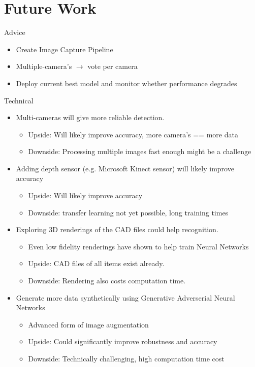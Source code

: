 \documentclass{beamer}
\begin{document}
\section{Future Work}
\begin{frame}{Advice}
\begin{itemize}
  \item Create Image Capture Pipeline
  \item Multiple-camera's $\rightarrow$ vote per camera
  \item Deploy current best model and monitor whether performance degrades
\end{itemize}
\end{frame}{}
\begin{frame}{Technical}
\begin{itemize}
 \item Multi-cameras will give more reliable detection.
  \begin{itemize}
  \item Upside: Will likely improve accuracy, more camera's == more data
  \item Downside: Processing multiple images fast enough might be a challenge 
  \end{itemize}
 \item Adding depth sensor (e.g. Microsoft Kinect sensor) will likely improve accuracy 
  \begin{itemize}
  \item Upside: Will likely improve accuracy 
  \item Downside: transfer learning not yet possible, long training times
  \end{itemize}
 \item Exploring 3D renderings of the CAD files could help recognition.
    \begin{itemize}
      \item Even low fidelity renderings have shown to help train Neural Networks
      \item Upside: CAD files of all items exist already.
      \item Downside: Rendering also costs computation time. 
    \end{itemize}
 \item Generate more data synthetically using Generative Adverserial Neural Networks
    \begin{itemize}
      \item Advanced form  of image augmentation 
      \item Upside: Could significantly improve robustness and accuracy 
      \item Downside: Technically challenging, high computation time cost 
    \end{itemize}
\end{itemize}
\end{frame}
\end{document}
